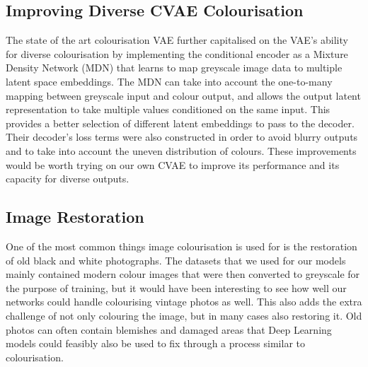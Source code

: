 \documentclass{l4proj}
\begin{document}
\subsection{Improving Diverse CVAE Colourisation}

The state of the art colourisation VAE \cite{DiverseColorization} further capitalised on the VAE's ability for diverse colourisation by implementing the conditional encoder as a Mixture Density Network (MDN) that learns to map greyscale image data to multiple latent space embeddings. The MDN can take into account the one-to-many mapping between greyscale input and colour output, and allows the output latent representation to take multiple values conditioned on the same input. This provides a better selection of different latent embeddings to pass to the decoder. Their decoder's loss terms were also constructed in order to avoid blurry outputs and to take into account the uneven distribution of colours. These improvements would be worth trying on our own CVAE to improve its performance and its capacity for diverse outputs.

\subsection{Image Restoration}

One of the most common things image colourisation is used for is the restoration of old black and white photographs. The datasets that we used for our models mainly contained modern colour images that were then converted to greyscale for the purpose of training, but it would have been interesting to see how well our networks could handle colourising vintage photos as well. This also adds the extra challenge of not only colouring the image, but in many cases also restoring it. Old photos can often contain blemishes and damaged areas that Deep Learning models could feasibly also be used to fix through a process similar to colourisation.

%
% 
\end{document}

